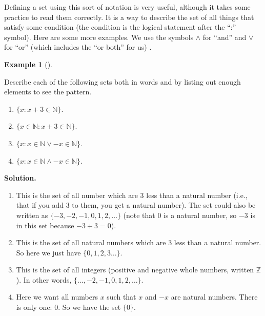 \documentclass[10pt,]{book}
\theoremstyle{plain}
\theoremstyle{definition}
\newtheorem{example}[theorem]{Example}
\theoremstyle{definition}
\theoremstyle{definition}
\numberwithin{equation}{section}
\def\N{\mathbb N}
\def\Z{\mathbb Z}
\def\st{:}
\begin{document}
      Defining a set using this sort of notation is very useful, although it takes some practice to read them correctly. It is a way to describe the set of all things that satisfy some condition (the condition is the logical statement after the ``:''      symbol). Here are some more examples. We use the symbols \(\wedge\) for ``and'' and \(\vee\) for ``or'' (which includes the ``or both'' for us)
      .
\begin{example}[]\label{example-10}

          Describe each of the following sets both in words and by listing out enough elements to see the pattern.
\leavevmode%
\begin{enumerate}
\item\hypertarget{li-60}{}\(\{x \st x + 3 \in \N\}\).\item\hypertarget{li-61}{}\(\{x \in \N \st x + 3 \in \N\}\).\item\hypertarget{li-62}{}\(\{x \st x \in \N \vee -x \in \N\}\).\item\hypertarget{li-63}{}\(\{x \st x \in \N \wedge -x \in \N\}\).\end{enumerate}
\par\medskip\noindent%
\textbf{Solution.}\quad \leavevmode%
\begin{enumerate}
\item\hypertarget{li-64}{}
              This is the set of all number which are 3 less than a natural number (i.e., that if you add 3 to them, you get a natural number). The set could also be written as \(\{-3, -2, -1, 0, 1, 2, \ldots\}\) (note that 0 is a natural number, so
              \(-3\) is in this set because \(-3 + 3 = 0\)).
\item\hypertarget{li-65}{}
              This is the set of all natural numbers which are 3 less than a natural number. So here we just have \(\{0, 1, 2,3 \ldots\}\).
\item\hypertarget{li-66}{}
              This is the set of all integers
               (positive and negative whole numbers, written \(\Z\)). In other words, \(\{\ldots, -2, -1, 0, 1, 2, \ldots\}\).
\item\hypertarget{li-67}{}
              Here we want all numbers \(x\) such that \(x\) and \(-x\) are natural numbers. There is only one: 0. So we have the set \(\{0\}\).
\end{enumerate}
\end{example}
\par
\end{document}
